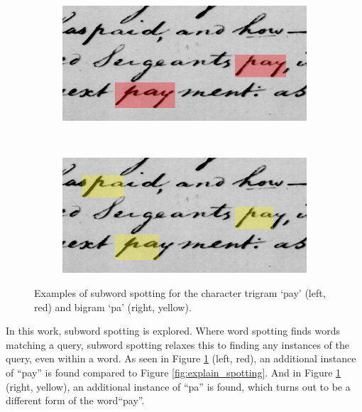 \documentclass[ms,electronic,twosidetoc,letterpaper,chaptercenter,parttop,lol,lof,lot]{byumsphd}
\begin{document}
\begin{figure}[t]
    \begin{subfigure}{0.46\textwidth}
    		\centering
    		\includegraphics[width=\textwidth]{spotting_explination_sub_pay}
    	\end{subfigure}
    	~
    	\begin{subfigure}{0.46\textwidth}
    		\centering
    		\includegraphics[width=\textwidth]{spotting_explination_sub_pa}
    	\end{subfigure}
    	\caption{Examples of subword spotting for the character trigram `pay' (left, red) and bigram `pa' (right, yellow).}
    	\label{fig:explain_sub_spotting}
\end{figure}

In this work, subword spotting is explored. Where word spotting finds words matching a query, subword spotting relaxes this to finding any instances of the query, even within a word. As seen in Figure \ref{fig:explain_sub_spotting} (left, red), an additional instance of ``pay'' is found compared to Figure \ref{fig:explain_spotting}.
And in Figure \ref{fig:explain_sub_spotting} (right, yellow), an additional instance of ``pa'' is found, which turns out to be a different form of the word``pay''.
\end{document}
